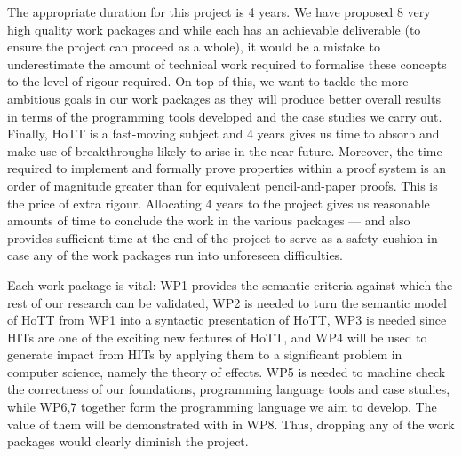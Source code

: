 \documentclass[a4paper,11pt]{article}
\begin{document}
\vspace{0.02in}

 The appropriate duration for
this project is 4 years. We have proposed 8 very high quality work
packages and while each has an achievable deliverable
(to ensure the project can proceed as a whole), it would be a mistake
to underestimate the amount of technical work required to formalise
these concepts to the level of rigour required. On top of this, we
want to tackle the more ambitious goals in our work packages as they
will produce better overall results in terms of the programming tools
developed and the case studies we carry out. Finally, HoTT is a
fast-moving subject and 4 years gives us time to absorb and make use
of breakthroughs likely to arise in the near future.  Moreover, the
time required to implement and formally prove properties within a
proof system is an order of magnitude greater than for equivalent
pencil-and-paper proofs. This is the price of extra rigour. Allocating
4 years to the project gives us reasonable amounts of time to conclude
the work in the various packages --- and also provides sufficient time
at the end of the project to serve as a safety cushion in case any of
the work packages run into unforeseen difficulties.


\noindent Each work package is vital: WP1 provides
the semantic criteria against which the rest of our
research can be validated, WP2 is needed to turn the semantic model of
HoTT from WP1 into a syntactic presentation of HoTT, WP3 is needed
since HITs are one of the exciting new features of HoTT, and WP4 will
be used to generate impact from HITs by applying them to a significant
problem in computer science, namely the theory of effects. WP5 is
needed to machine check the correctness of our foundations,
programming language tools and case studies, while WP6,7
together form the programming language we aim to develop. The
value of them will be demonstrated with in WP8.
Thus, dropping any of the work packages would clearly diminish the
project.

\vspace{0.02in}
\end{document}
